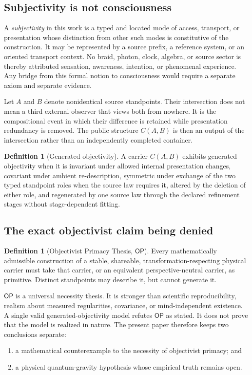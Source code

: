 \documentclass[11pt]{article}
\theoremstyle{definition}
\newtheorem{definition}[theorem]{Definition}
\theoremstyle{remark}
\newcommand{\OPT}{\mathsf{OP}}
\begin{document}
\subsection{Subjectivity is not consciousness}

A \emph{subjectivity} in this work is a typed and located mode of access, transport, or presentation whose distinction from other such modes is constitutive of the construction. It may be represented by a source prefix, a reference system, or an oriented transport context. No braid, photon, clock, algebra, or source sector is thereby attributed sensation, awareness, intention, or phenomenal experience. Any bridge from this formal notion to consciousness would require a separate axiom and separate evidence.

Let $A$ and $B$ denote nonidentical source standpoints. Their intersection does not mean a third external observer that views both from nowhere. It is the compositional event in which their difference is retained while presentation redundancy is removed. The public structure $C(A,B)$ is then an output of the intersection rather than an independently completed container.

\begin{definition}[Generated objectivity]
A carrier $C(A,B)$ exhibits generated objectivity when it is invariant under allowed internal presentation changes, covariant under ambient re-description, symmetric under exchange of the two typed standpoint roles when the source law requires it, altered by the deletion of either role, and regenerated by one source law through the declared refinement stages without stage-dependent fitting.
\end{definition}

\subsection{The exact objectivist claim being denied}

\begin{definition}[Objectivist Primacy Thesis, $\OPT$]
Every mathematically admissible construction of a stable, shareable, transformation-respecting physical carrier must take that carrier, or an equivalent perspective-neutral carrier, as primitive. Distinct standpoints may describe it, but cannot generate it.
\end{definition}

$\OPT$ is a universal necessity thesis. It is stronger than scientific reproducibility, realism about measured regularities, covariance, or mind-independent existence. A single valid generated-objectivity model refutes $\OPT$ as stated. It does not prove that the model is realized in nature. The present paper therefore keeps two conclusions separate:
\begin{enumerate}
\item a mathematical counterexample to the necessity of objectivist primacy; and
\item a physical quantum-gravity hypothesis whose empirical truth remains open.
\end{enumerate}
\end{document}
